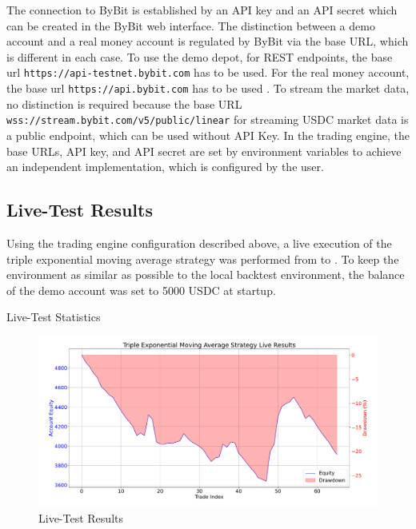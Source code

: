 \noindent
The connection to ByBit is established by an API key and an API secret which can be created in the ByBit web interface.
The distinction between a demo account and a real money account is regulated by ByBit via the base URL, which is different in each case.
To use the demo depot, for REST endpoints, the base url \texttt{https://api-testnet.bybit.com} has to be used.
For the real money account, the base url \texttt{https://api.bybit.com} has to be used \cite{integration}.
To stream the market data, no distinction is required because the base URL \texttt{wss://stream.bybit.com/v5/public/linear} \cite{ws-connect} for streaming USDC market data is a public endpoint, which can be used without API Key.
In the trading engine, the base URLs, API key, and API secret are set by environment variables to achieve an independent implementation, which is configured by the user.

\subsection{Live-Test Results}

Using the trading engine configuration described above, a live execution of the triple exponential moving average strategy was performed from \liveStartDataStartDate to \liveStartDataEndDate.
To keep the environment as similar as possible to the local backtest environment, the balance of the demo account was set to 5000 USDC at startup.

\begin{table}
    \centering
    
    \caption{Live-Test Statistics}
    \label{tbl:live-results}
\end{table}

\begin{figure}[H]
    \centering
    \includegraphics[width=\textwidth]{images/live/live-result}
    \caption{Live-Test Results}
    \label{fig:live-results}
\end{figure}

